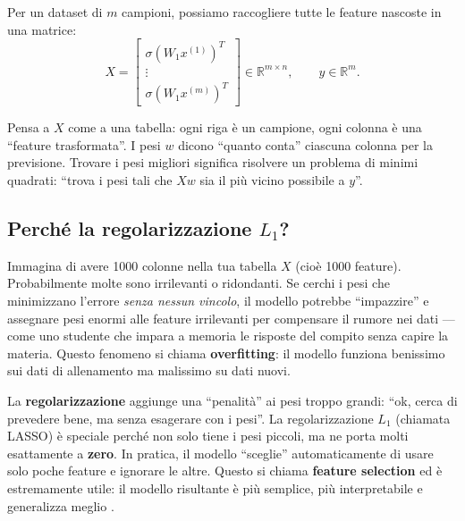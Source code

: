 \documentclass[a4paper,11pt]{article}
\theoremstyle{definition}
\newcommand{\R}{\mathbb{R}}
\begin{document}
Per un dataset di $m$ campioni, possiamo raccogliere tutte le feature nascoste in una matrice:
\[
  X = \begin{bmatrix} \sigma(W_1 x^{(1)})^T \\ \vdots \\ \sigma(W_1 x^{(m)})^T \end{bmatrix} \in \R^{m \times n}, \qquad y \in \R^m.
\]

\begin{analogia}
Pensa a $X$ come a una tabella: ogni riga è un campione, ogni colonna è una ``feature trasformata''. I pesi $w$ dicono ``quanto conta'' ciascuna colonna per la previsione. Trovare i pesi migliori significa risolvere un problema di minimi quadrati: ``trova i pesi tali che $Xw$ sia il più vicino possibile a $y$''.
\end{analogia}

\subsection{Perché la regolarizzazione \texorpdfstring{$L_1$}{L1}?}
\label{subsec:perche_l1}

\begin{intuizione}
Immagina di avere 1000 colonne nella tua tabella $X$ (cioè 1000 feature). Probabilmente molte sono irrilevanti o ridondanti. Se cerchi i pesi che minimizzano l'errore \emph{senza nessun vincolo}, il modello potrebbe ``impazzire'' e assegnare pesi enormi alle feature irrilevanti per compensare il rumore nei dati --- come uno studente che impara a memoria le risposte del compito senza capire la materia. Questo fenomeno si chiama \textbf{overfitting}: il modello funziona benissimo sui dati di allenamento ma malissimo su dati nuovi.

La \textbf{regolarizzazione} aggiunge una ``penalità'' ai pesi troppo grandi: ``ok, cerca di prevedere bene, ma senza esagerare con i pesi''. La regolarizzazione $L_1$ (chiamata LASSO) è speciale perché non solo tiene i pesi piccoli, ma ne porta molti esattamente a \textbf{zero}. In pratica, il modello ``sceglie'' automaticamente di usare solo poche feature e ignorare le altre. Questo si chiama \textbf{feature selection} ed è estremamente utile: il modello risultante è più semplice, più interpretabile e generalizza meglio \cite[cf.\ \S5.1.2]{opt-notes}.
\end{intuizione}
\end{document}
